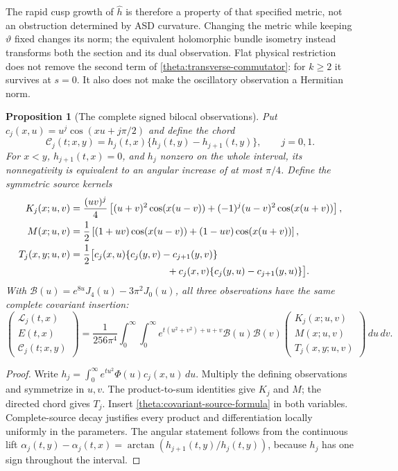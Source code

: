 \documentclass[11pt]{article}
\numberwithin{equation}{section}
\newtheorem{proposition}[theorem]{Proposition}
\theoremstyle{definition}
\theoremstyle{remark}
\newcommand{\Ephys}{E}
\begin{document}
The rapid cusp growth of $\widehat h$ is therefore a property of that
specified metric, not an obstruction determined by ASD curvature.
Changing the metric while keeping $\vartheta$ fixed changes its norm;
the equivalent holomorphic bundle isometry instead transforms both the
section and its dual observation.  Flat physical restriction does not
remove the second term of \eqref{theta:transverse-commutator}: for
$k\ge2$ it survives at $s=0$.  It also does not make the oscillatory
observation a Hermitian norm.

\begin{proposition}[The complete signed bilocal observations]
\label{theta:bilocal-complete}
Put $c_j(x,u)=u^j\cos(xu+j\pi/2)$ and define the chord
\[
 \mathcal C_j(t;x,y)
   =h_j(t,x)\{h_j(t,y)-h_{j+1}(t,y)\},\qquad j=0,1.
\]
For $x<y$, $h_{j+1}(t,x)=0$, and $h_j$ nonzero on the whole interval,
its nonnegativity is equivalent to an angular increase of at most
$\pi/4$.  Define the symmetric source kernels
\begin{align}
 K_j(x;u,v)
 &=\frac{(uv)^j}{4}\left[(u+v)^2\cos(x(u-v))
       +(-1)^j(u-v)^2\cos(x(u+v))\right],\label{theta:K-complete}\\
 M(x;u,v)
 &=\frac12\left[(1+uv)\cos(x(u-v))
                       +(1-uv)\cos(x(u+v))\right],\label{theta:M-complete}\\
 T_j(x,y;u,v)
 &=\frac12\bigl[c_j(x,u)\{c_j(y,v)-c_{j+1}(y,v)\}
 \notag\\[-2pt]
 &\hspace{35mm}+c_j(x,v)\{c_j(y,u)-c_{j+1}(y,u)\}\bigr].
 \label{theta:T-complete}
\end{align}
With $\mathcal B(u)=e^{8u}J_4(u)-3\pi^2J_0(u)$, all three
observations have the same complete covariant insertion:
\begin{equation}
 \begin{pmatrix}\mathcal L_j(t,x)\\ \Ephys(t,x)\\
                       \mathcal C_j(t;x,y)\end{pmatrix}
 =\frac1{256\pi^4}\int_0^\infty\!\int_0^\infty
 e^{t(u^2+v^2)+u+v}\mathcal B(u)\mathcal B(v)
 \begin{pmatrix}K_j(x;u,v)\\M(x;u,v)\\T_j(x,y;u,v)\end{pmatrix}
 \,du\,dv.
 \label{theta:complete-bilocal-insertion}
\end{equation}
\end{proposition}
\begin{proof}
Write $h_j=\int_0^\infty e^{tu^2}\Phi(u)c_j(x,u)\,du$.
Multiply the defining observations and symmetrize in $u,v$.
The product-to-sum identities give $K_j$ and $M$; the directed chord
gives $T_j$.  Insert \eqref{theta:covariant-source-formula} in both
variables.  Complete-source decay justifies every product and
differentiation locally uniformly in the parameters.  The angular
statement follows from the continuous lift
$\alpha_j(t,y)-\alpha_j(t,x)=\arctan(h_{j+1}(t,y)/h_j(t,y))$,
because $h_j$ has one sign throughout the interval.
\end{proof}
\end{document}
